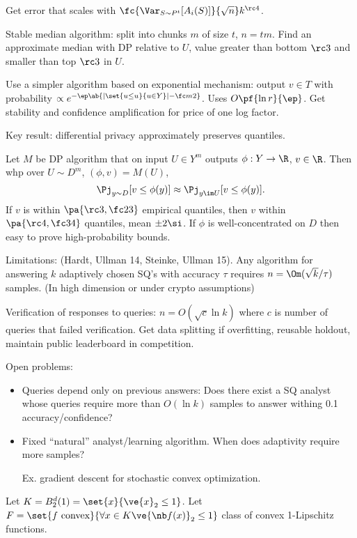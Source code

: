 Get error that scales with $\fc{\Var_{S\sim P^t} [A_i(S)]}{\sqrt n}k^{\rc 4}$.

Stable median algorithm: split into chunks $m$ of size $t$, $n=tm$. Find an approximate median with DP relative to $U$, value greater than bottom $\rc 3$ and smaller than top $\rc 3$ in $U$.

Use a simpler algorithm based on exponential mechanism: output $v\in T$ with probability $\propto e^{-\ep \ab{|\set{u\le u}{u\in Y}| - \fc m2}}$. Uses $O\pf{\ln r}{\ep}$. Get stability and confidence amplification for price of one log factor.

Key result: differential privacy approximately preserves quantiles. 

Let $M$ be DP algorithm that on input $U\in Y^m$ outputs $\phi:Y\to \R$, $v\in \R$. Then whp over $U\sim D^m$, $(\phi,v)=M(U)$, 
$$
\Pj_{y\sim D}[v\le \phi(y)] \approx \Pj_{y\im U}[v\le \phi(y)].
$$
If $v$ is within $\pa{\rc 3, \fc 23}$ empirical quantiles, then $v$ within $\pa{\rc 4, \fc 34}$ quantiles, mean $\pm 2\si$. 
If $\phi$ is well-concentrated on $D$ then easy to prove high-probability bounds.

Limitations: 
(Hardt, Ullman 14, Steinke, Ullman 15). Any algorithm for answering $k$ adaptively chosen SQ's with accuracy $\tau$ requires $n=\Om(\sqrt k/\tau)$ samples. (In high dimension or under crypto assumptions)

Verification of responses to queries: $n=O(\sqrt c \ln k)$ where $c$ is number of queries that failed verification. Get data splitting if overfitting, reusable holdout, maintain public leaderboard in competition.

Open problems:
\begin{itemize}
\item
Queries depend only on previous answers: Does there exist a SQ analyst whose queries require more than $O(\ln k)$ samples to answer withing 0.1 accuracy/confidence?
\item
Fixed ``natural'' analyst/learning algorithm. When does adaptivity require more samples?

Ex. gradient descent for stochastic convex optimization.
\end{itemize}

Let $K=B_2^d(1)=\set{x}{\ve{x}_2\le 1}$. Let $F=\set{f\text{ convex}}{\forall x\in K\ve{\nb f(x)}_2\le 1}$ class of convex 1-Lipschitz functions. 

